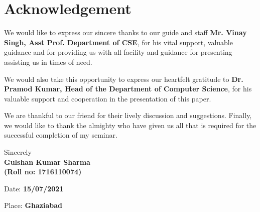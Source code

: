 	\chapter*{Acknowledgement}
We would like to express our sincere thanks to our guide and staff \textbf{Mr. Vinay Singh, Asst Prof. Department of CSE}, for his vital support, valuable guidance and for providing us with all facility and guidance for presenting assisting us in times of need.\vspace{.3cm}
      
We would also take this opportunity to express our heartfelt gratitude to \textbf{Dr. Pramod Kumar, Head of the Department of Computer Science}, for his valuable support and cooperation in the presentation of this paper.\vspace{.3cm}

We are thankful to our friend for their lively discussion and suggestions. Finally, we would like to thank the almighty who have given us all that is required for the successful completion of my seminar.


\vspace{1.5cm}

\begin{minipage}{.4\linewidth}
	
		Sincerely\\
	\textbf{	Gulshan Kumar Sharma\\
		(Roll no: 1716110074)}
		\vspace{.3cm}
		
		Date: \textbf{15/07/2021}\vspace{.2cm}
		
		Place: \textbf{Ghaziabad}
		
\end{minipage}
